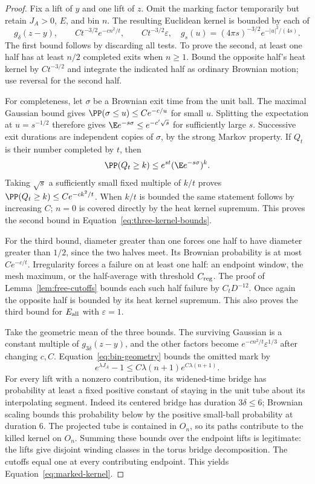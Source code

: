 \begin{proof}
Fix a lift of $y$ and one lift of $z$.  Omit the marking
factor temporarily but retain $J_A>0$, $E$, and bin $n$.
The resulting Euclidean kernel is bounded by each of
\begin{equation}\label{eq:three-kernel-bounds}
 g_\delta(z-y),\qquad
 Ct^{-3/2}e^{-cn^2/t},\qquad
 Ct^{-3/2}\varepsilon,
 \quad
 g_s(u)=(4\pi s)^{-3/2}e^{-|u|^2/(4s)}.
\end{equation}
The first bound follows by discarding all tests.  To prove
the second, at least one half has at least $n/2$ completed
exits when $n\ge1$.  Bound the opposite half's heat kernel
by $Ct^{-3/2}$ and integrate the indicated half as ordinary
Brownian motion; use reversal for the second half.

For completeness, let $\sigma$ be a Brownian exit time
from the unit ball.  The maximal Gaussian bound gives
$\PP(\sigma\le u)\le Ce^{-c/u}$ for small $u$.
Splitting the expectation at $u=s^{-1/2}$ therefore gives
$\E e^{-s\sigma}\le e^{-c'\sqrt s}$ for sufficiently
large $s$.  Successive exit durations are independent
copies of $\sigma$, by the strong Markov property.
If $Q_t$ is their number completed by $t$, then
\[
 \PP(Q_t\ge k)\le e^{st}(\E e^{-s\sigma})^k.
\]
Taking $\sqrt s$ a sufficiently small fixed multiple of
$k/t$ proves $\PP(Q_t\ge k)\le Ce^{-ck^2/t}$.
When $k/t$ is bounded the same statement follows by
increasing $C$; $n=0$ is covered directly by the heat
kernel supremum.  This proves the second bound in
Equation~\eqref{eq:three-kernel-bounds}.

For the third bound, diameter greater than one forces
one half to have diameter greater than $1/2$, since the
two halves meet.  Its Brownian probability is at most
$Ce^{-c/t}$.  Irregularity forces a failure on at least
one half: an endpoint window, the mesh maximum, or the
half-average with threshold $C_{\rm reg}$.  The proof of
Lemma~\ref{lem:free-cutoffs} bounds each such half failure
by $C_tD^{-12}$.  Once again the opposite half is bounded
by its heat kernel supremum.  This also proves the third
bound for $E_{\rm all}$ with $\varepsilon=1$.

Take the geometric mean of the three bounds.  The surviving
Gaussian is a constant multiple of $g_{3\delta}(z-y)$,
and the other factors become
$e^{-cn^2/t}\varepsilon^{1/3}$ after changing $c,C$.
Equation~\eqref{eq:bin-geometry} bounds the omitted mark by
\[
 e^{\lambda J_A}-1
 \le C\lambda(n+1)e^{C\lambda(n+1)}.
\]
For every lift with a nonzero contribution, its widened-time
bridge has probability at least a fixed positive constant
of staying in the unit tube about its interpolating segment.
Indeed its centered bridge has duration $3\delta\le6$;
Brownian scaling bounds this probability below by the
positive small-ball probability at duration $6$.
The projected tube is contained in $O_n$, so its paths
contribute to the killed kernel on $O_n$.  Summing these
bounds over the endpoint lifts is legitimate: the lifts
give disjoint winding classes in the torus bridge
decomposition.  The cutoffs equal one at every contributing
endpoint.  This yields Equation~\eqref{eq:marked-kernel}.
\end{proof}

